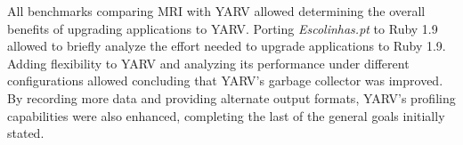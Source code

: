 All benchmarks comparing MRI with YARV allowed determining the overall benefits of upgrading applications to YARV. Porting \textit{Escolinhas.pt} to Ruby 1.9 allowed to briefly analyze the effort needed to upgrade applications to Ruby 1.9. Adding flexibility to YARV and analyzing its performance under different configurations allowed concluding that YARV's garbage collector was improved. By recording more data and providing alternate output formats, YARV's profiling capabilities were also enhanced, completing the last of the general goals initially stated.
